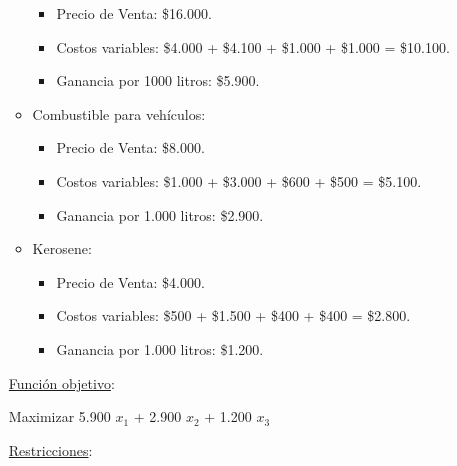\documentclass[10pt,a4paper]{article}
\begin{document}
\begin{enumerate}
\begin{itemize}
\begin{itemize}
            \item Precio de Venta: \$16.000.
            \item Costos variables: \$4.000 + \$4.100 + \$1.000 + \$1.000 = \$10.100.
            \item Ganancia por 1000 litros: \$5.900. \\
    
        \end{itemize}

        \item Combustible para vehículos:
        \begin{itemize}

            \item Precio de Venta: \$8.000.
            \item Costos variables: \$1.000 + \$3.000 + \$600 + \$500 = \$5.100.
            \item Ganancia por 1.000 litros: \$2.900. \\
    
        \end{itemize}

        \item Kerosene:
        \begin{itemize}

            \item Precio de Venta: \$4.000.
            \item Costos variables: \$500 + \$1.500 + \$400 + \$400 = \$2.800.
            \item Ganancia por 1.000 litros: \$1.200. \\
    
        \end{itemize}

    \end{itemize}


    \underline{Función objetivo}: 

    \begin{center}
        
        Maximizar 5.900 $x_{1}$ + 2.900 $x_{2}$ + 1.200 $x_{3}$

    \end{center}


    \underline{Restricciones}: 

    \begin{itemize}


\end{itemize}
\end{enumerate}
\end{document}
